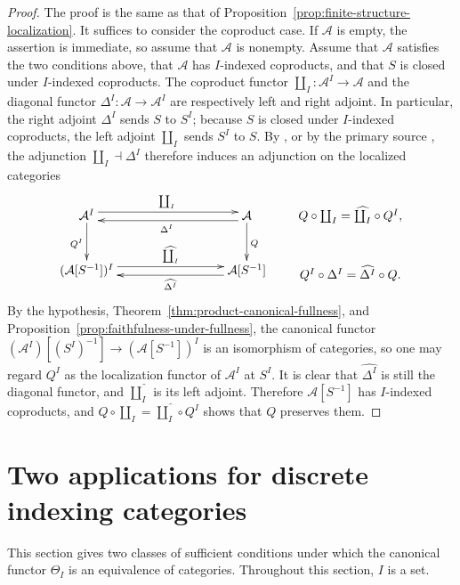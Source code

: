 \documentclass[10pt,a4paper]{amsart}
\theoremstyle{plain}
\theoremstyle{definition}
\theoremstyle{remark}
\begin{document}
\begin{proof}
  The proof is the same as that of Proposition~\ref{prop:finite-structure-localization}.
  It suffices to consider the coproduct case.
  If $\mathcal A$ is empty, the assertion is immediate, so assume that $\mathcal A$ is nonempty.
  Assume that $\mathcal{A}$ satisfies the two conditions above, that $\mathcal{A}$ has $I$-indexed coproducts, and that $S$ is closed under $I$-indexed coproducts.
  The coproduct functor $\coprod_I : \mathcal{A}^I \longrightarrow \mathcal{A}$ and the diagonal functor $\Delta^I : \mathcal{A} \longrightarrow \mathcal{A} ^I$ are respectively left and right adjoint.
  In particular, the right adjoint $\Delta^I$ sends $S$ to $S^I$; because $S$ is closed under $I$-indexed coproducts, the left adjoint $\coprod_I$ sends $S^I$ to $S$.
  By \cite[Lemma~1.1.6, p.~9]{KrauseHomologicalTheory}, or by the primary source \cite[Chapter~I, \S~1, Lemma~1.2, p.~7]{GabrielZisman}, the adjunction $\coprod_I \dashv \Delta^I$ therefore induces an adjunction on the localized categories
  \[
    \xymatrix@C=30mm@R=10mm{
    \mathcal A^I
    \ar@<0.8ex>[r]^{\coprod_I}
    \ar[d]_{Q^I}
    &
    \mathcal A
    \ar@<0.8ex>[l]^{\Delta^I}
    \ar[d]^{Q}
    \\
    (\mathcal A[S^{-1}])^I
    \ar@<0.8ex>[r]^-{\widehat {\coprod_I}}
    &
    \mathcal A[S^{-1}]
    \ar@<0.8ex>[l]^-{\widehat{\Delta^I}}
    } \qquad \xymatrix@R=10mm{
    Q \circ \coprod_I = \widehat{\coprod_I} \circ Q^I,\\
    Q^I \circ \Delta^I = \widehat{\Delta^I} \circ Q.
    }
  \]
  By the hypothesis, Theorem~\ref{thm:product-canonical-fullness}, and Proposition~\ref{prop:faithfulness-under-fullness}, the canonical functor $(\mathcal{A}^I)[(S^I)^{-1}] \longrightarrow (\mathcal{A}[S^{-1}])^I$ is an isomorphism of categories, so one may regard $Q^I$ as the localization functor of $\mathcal A^I$ at $S^I$.
  It is clear that $\widehat{\Delta^I}$ is still the diagonal functor, and $\widehat{\coprod_I}$ is its left adjoint.
  Therefore $\mathcal A[S^{-1}]$ has $I$-indexed coproducts, and $Q\circ\coprod_I=\widehat{\coprod_I}\circ Q^I$ shows that $Q$ preserves them.
\end{proof}


\section{Two applications for discrete indexing categories}\label{sec:discrete-applications}

This section gives two classes of sufficient conditions under which the canonical functor $\Theta_I$ is an equivalence of categories.
Throughout this section, $I$ is a set.
\end{document}
